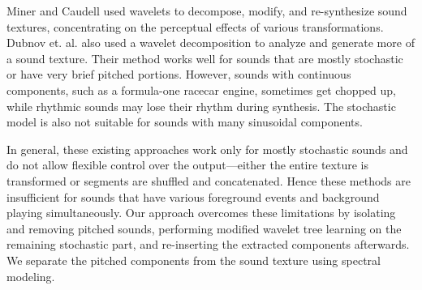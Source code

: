 \documentclass[twoside]{article}
\begin{document}
Miner and Caudell \cite{paper:85:Miner97} used wavelets to decompose, 
modify, and re-synthesize sound textures, concentrating 
on the perceptual effects of various transformations. 
Dubnov et. al. \cite{paper:85:Dubnov02} also used a wavelet decomposition to 
analyze and generate more of a sound texture. 
Their method works well for sounds that are mostly 
stochastic or have very brief pitched portions. However, sounds with 
continuous components, such as a formula-one racecar engine, sometimes 
get chopped up, while rhythmic sounds may lose their rhythm during 
synthesis. The stochastic model is also not suitable for sounds with 
many sinusoidal components.
 
In general, these existing approaches work only for mostly stochastic sounds and 
do not allow flexible control over the output---either the entire texture is 
transformed or segments are shuffled and concatenated. Hence 
these methods are insufficient for sounds that have various foreground events and 
background playing simultaneously.
Our approach overcomes these limitations by isolating and removing 
pitched sounds, performing modified wavelet tree learning 
\cite{paper:85:Dubnov02} on the  
remaining stochastic part, and re-inserting the extracted components 
afterwards. We separate the pitched components from the sound texture 
using spectral modeling.



\end{document}
